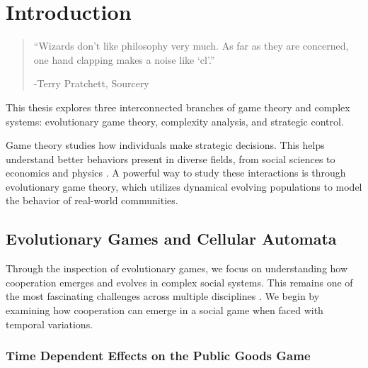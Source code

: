 \chapter{Introduction}
\label{chap:Intro}

\begin{quotation}

\vspace{-3cm}

\begin{flushright}
\begin{minipage}[t][5cm][b]{0.5\textwidth}
{ ``Wizards don’t like philosophy very much. As far as they are concerned, one hand clapping makes a noise like `cl'.''}

\bigskip

-{\small  Terry Pratchett, Sourcery }
\end{minipage}
\end{flushright}

\vspace{0.5cm}

\end{quotation}



This thesis explores three interconnected branches of game theory and complex systems: evolutionary game theory, complexity analysis, and strategic control. 

Game theory studies how individuals make strategic decisions. This helps understand better behaviors present in diverse fields, from social sciences to economics and physics \cite{cit:Social,cit:EconomyGames,cit:GamesComplex}. A powerful way to study these interactions is through evolutionary game theory, which utilizes dynamical evolving populations to model the behavior of real-world communities. 

\section{Evolutionary Games and Cellular Automata}

Through the inspection of evolutionary games, we focus on understanding how cooperation emerges and evolves in complex social systems. This remains one of the most fascinating challenges across multiple disciplines \cite{cit:SocialPhy}. We begin by examining how cooperation can emerge in a social game when faced with temporal variations. 

\subsection{Time Dependent Effects on the Public Goods Game}

